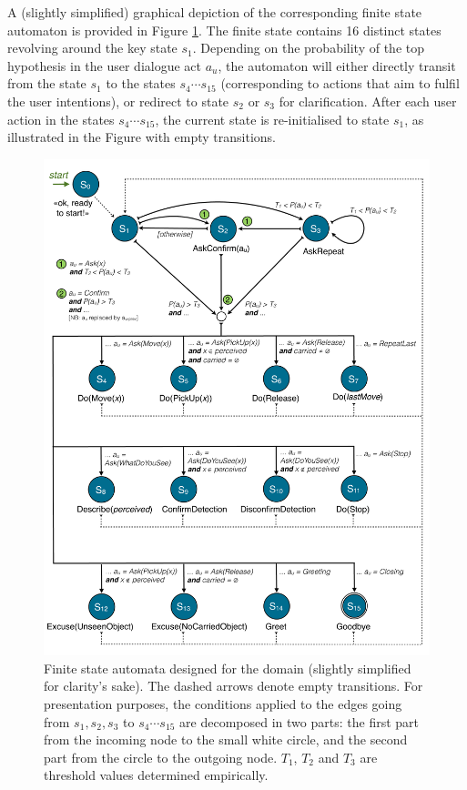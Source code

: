 A (slightly simplified) graphical depiction of the corresponding finite state automaton is provided in Figure \ref{fig:fsa-exp3}.  The finite state contains 16 distinct states revolving around the key state $s_1$.  Depending on the probability of the top hypothesis in the user dialogue act $a_u$, the automaton will either directly transit from the state $s_1$ to the states $s_4 \cdots s_{15}$ (corresponding to actions that aim to fulfil the user intentions), or redirect to state $s_2$ or $s_3$ for clarification. After each user action in the states $s_4 \cdots s_{15}$, the current state is re-initialised to state $s_1$, as illustrated in the Figure with empty transitions. 


\begin{figure}[p]
\centering
\includegraphics[scale=0.4]{imgs/fsa-exp3.pdf} 
\caption{Finite state automata designed for the domain (slightly simplified for clarity's sake). The dashed arrows denote empty transitions. For presentation purposes, the conditions applied to the edges going from $s_1,s_2,s_3$ to $s_4 \cdots s_{15}$ are decomposed in two parts: the first part from the incoming node to the small white circle, and the second part from the circle to the outgoing node. $T_1$, $T_2$ and $T_3$ are threshold values determined empirically.}
\label{fig:fsa-exp3}
\end{figure}


